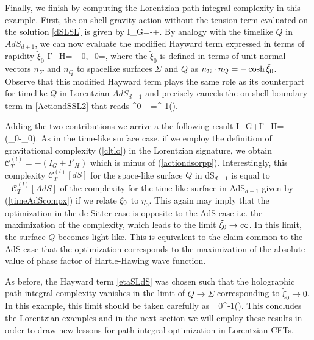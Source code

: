 \documentclass[a4paper,12pt]{article}
\begin{document}
 Finally, we finish by computing the Lorentzian path-integral complexity in this example. First, the on-shell gravity action without the tension term evaluated on the solution \eqref{dSLSL} is given by
\be
I_G=-+.
\ee
By analogy with the timelike $Q$ in $AdS_{d+1}$, we can now evaluate the modified Hayward term  expressed in terms of rapidity $\tilde{\xi}_0$ 
\be
I'_H=-\ti{\xi}_0,\qquad \sinh\ti{\xi}_0=,\label{etaSLdS}
\ee
where the $\tilde{\xi}_0$ is defined in terms of unit normal vectors $n_\Sigma$ and $n_Q$ to spacelike surfaces $\Sigma$ and $Q$ as $n_\Sigma\cdot n_{Q}=-\cosh\tilde{\xi}_0$.\\
Observe that this modified Hayward term plays the same role as its counterpart for timelike $Q$ in Lorentzian $AdS_{d+1}$ and precisely cancels the on-shell boundary term in \eqref{ActiondSSL2} that reads
\be
{}^0_{-\infty}=\sinh^{-1}\left(\right).
\ee

Adding the two contributions we arrive a the following result 
\be
I_G+I'_H=-+
(\coth\ti{\xi}_0-\ti{\xi}_0).  \label{actiondsorpp}
\ee
As in the time-like surface case,  if we employ the definition of gravitational complexity 
(\ref{cltlo}) in the Lorentzian signature,
we obtain $\mathcal{C}^{(l)}_T=-(I_G+I'_H)$ which is minus of (\ref{actiondsorpp}). Interestingly, 
this complexity  $\mathcal{C}^{(l)}_T[dS]$ for the space-like surface $Q$ in  dS$_{d+1}$ is equal to $-\mathcal{C}^{(l)}_T[AdS]$ of the complexity for the time-like surface in AdS$_{d+1}$ given by (\ref{timeAdScompx})
if we relate 
$\tilde{\xi}_0$ to $\eta_0$.
This again may imply that the optimization in the de Sitter case is opposite to the AdS case i.e. the maximization of the complexity, which leads to the limit $\tilde{\xi}_0\to \infty$. In this limit, the surface $Q$ becomes light-like. This is equivalent to the claim common to the AdS case that the optimization corresponds to the maximization of the absolute value of phase factor of Hartle-Hawing wave function.

As before, the Hayward term \eqref{etaSLdS} was chosen such that the holographic path-integral complexity vanishes in the limit of $Q\to\Sigma$ corresponding to $\tilde{\xi}_0\to 0$. In this example, this limit should be taken carefully as
\be
\tilde{\xi}_0\to  \coth^{-1}\left(\right).
\ee
This concludes the Lorentzian examples and in the next section we will employ these results in order to draw new lessons for path-integral optimization in Lorentzian CFTs.
\end{document}
